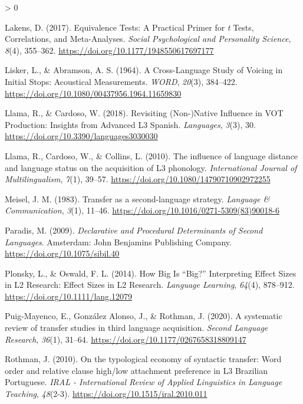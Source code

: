 \documentclass[
  english,
  man]{apa6}
\newlength{\cslhangindent}
\newenvironment{CSLReferences}[2] %
 {%
  \setlength{\parindent}{0pt}
  \ifodd #1 \everypar{\setlength{\hangindent}{\cslhangindent}}\ignorespaces\fi
  \ifnum #2 > 0
  \setlength{\parskip}{#2\baselineskip}
  \fi
 }%
 {}
\begin{document}
\begin{CSLReferences}{1}{0}
\leavevmode\hypertarget{ref-lakens_equivalence_2017}{}%
Lakens, D. (2017). Equivalence {Tests}: {A} {Practical} {Primer} for \emph{t} {Tests}, {Correlations}, and {Meta}-{Analyses}. \emph{Social Psychological and Personality Science}, \emph{8}(4), 355--362. \url{https://doi.org/10.1177/1948550617697177}

\leavevmode\hypertarget{ref-lisker_cross-language_1964}{}%
Lisker, L., \& Abramson, A. S. (1964). A {Cross}-{Language} {Study} of {Voicing} in {Initial} {Stops}: {Acoustical} {Measurements}. \emph{\emph{WORD}}, \emph{20}(3), 384--422. \url{https://doi.org/10.1080/00437956.1964.11659830}

\leavevmode\hypertarget{ref-llama_revisiting_2018}{}%
Llama, R., \& Cardoso, W. (2018). Revisiting ({Non}-){Native} {Influence} in {VOT} {Production}: {Insights} from {Advanced} {L3} {Spanish}. \emph{Languages}, \emph{3}(3), 30. \url{https://doi.org/10.3390/languages3030030}

\leavevmode\hypertarget{ref-llama_influence_2010}{}%
Llama, R., Cardoso, W., \& Collins, L. (2010). The influence of language distance and language status on the acquisition of {L3} phonology. \emph{International Journal of Multilingualism}, \emph{7}(1), 39--57. \url{https://doi.org/10.1080/14790710902972255}

\leavevmode\hypertarget{ref-meisel_transfer_1983}{}%
Meisel, J. M. (1983). Transfer as a second-language strategy. \emph{Language \& Communication}, \emph{3}(1), 11--46. \url{https://doi.org/10.1016/0271-5309(83)90018-6}

\leavevmode\hypertarget{ref-paradis_declarative_2009}{}%
Paradis, M. (2009). \emph{Declarative and {Procedural} {Determinants} of {Second} {Languages}}. Amsterdam: John Benjamins Publishing Company. \url{https://doi.org/10.1075/sibil.40}

\leavevmode\hypertarget{ref-plonsky_how_2014}{}%
Plonsky, L., \& Oswald, F. L. (2014). How {Big} {Is} {``{Big}?''} {Interpreting} {Effect} {Sizes} in {L2} {Research}: {Effect} {Sizes} in {L2} {Research}. \emph{Language Learning}, \emph{64}(4), 878--912. \url{https://doi.org/10.1111/lang.12079}

\leavevmode\hypertarget{ref-puig-mayenco_systematic_2020}{}%
Puig-Mayenco, E., González Alonso, J., \& Rothman, J. (2020). A systematic review of transfer studies in third language acquisition. \emph{Second Language Research}, \emph{36}(1), 31--64. \url{https://doi.org/10.1177/0267658318809147}

\leavevmode\hypertarget{ref-rothman_typological_2010}{}%
Rothman, J. (2010). On the typological economy of syntactic transfer: {Word} order and relative clause high/low attachment preference in {L3} {Brazilian} {Portuguese}. \emph{IRAL - International Review of Applied Linguistics in Language Teaching}, \emph{48}(2-3). \url{https://doi.org/10.1515/iral.2010.011}


\end{CSLReferences}
\end{document}
